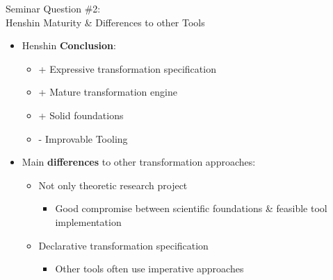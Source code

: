 \documentclass[10pt]{beamer}
\begin{document}
\begin{frame}{Seminar Question \#2: \\Henshin Maturity \& Differences to other Tools}

	\begin{itemize}
		\item Henshin \textbf{Conclusion}:
		\begin{itemize}
			\item + Expressive transformation specification
	  		\item + Mature transformation engine
  			\item + Solid foundations
  			\item - Improvable Tooling
		\end{itemize}
	\end{itemize}
	
	\begin{itemize}
		\item Main \textbf{differences} to other transformation approaches:
		\begin{itemize}
			\item Not only theoretic research project
			\begin{itemize}
				\item Good compromise between scientific foundations \& feasible tool implementation
			\end{itemize}
			\item Declarative transformation specification
			\begin{itemize}
				\item Other tools often use imperative approaches
			\end{itemize}
		\end{itemize}
	\end{itemize}

\end{frame}
\end{document}
